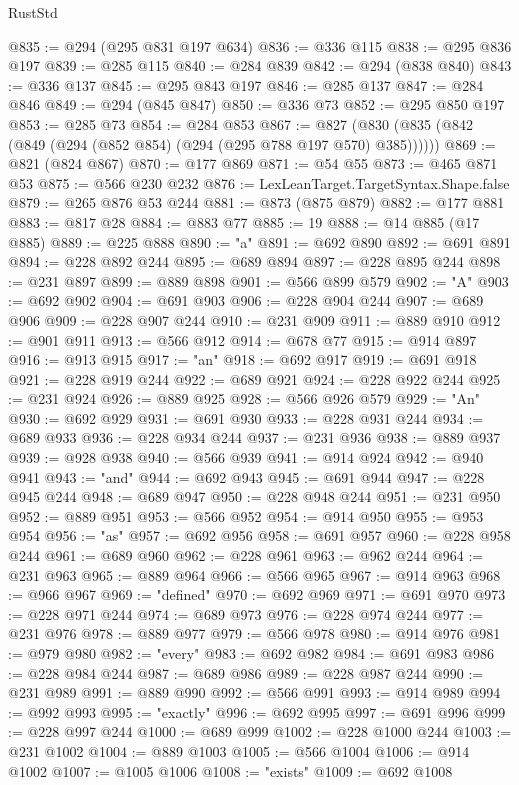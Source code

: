 \begin{lexlean}{RustStd}
\begin{coremodule}
@835 := @294 (@295 @831 @197 @634)
@836 := @336 @115
@838 := @295 @836 @197
@839 := @285 @115
@840 := @284 @839
@842 := @294 (@838 @840)
@843 := @336 @137
@845 := @295 @843 @197
@846 := @285 @137
@847 := @284 @846
@849 := @294 (@845 @847)
@850 := @336 @73
@852 := @295 @850 @197
@853 := @285 @73
@854 := @284 @853
@867 := @827 (@830 (@835 (@842 (@849 (@294 (@852 @854) (@294 (@295 @788 @197 @570) @385))))))
@869 := @821 (@824 @867)
@870 := @177 @869
@871 := @54 @55
@873 := @465 @871 @53
@875 := @566 @230 @232
@876 := LexLeanTarget.TargetSyntax.Shape.false
@879 := @265 @876 @53 @244
@881 := @873 (@875 @879)
@882 := @177 @881
@883 := @817 @28
@884 := @883 @77
@885 := 19
@888 := @14 @885 (@17 @885)
@889 := @225 @888
@890 := "a"
@891 := @692 @890
@892 := @691 @891
@894 := @228 @892 @244
@895 := @689 @894
@897 := @228 @895 @244
@898 := @231 @897
@899 := @889 @898
@901 := @566 @899 @579
@902 := "A"
@903 := @692 @902
@904 := @691 @903
@906 := @228 @904 @244
@907 := @689 @906
@909 := @228 @907 @244
@910 := @231 @909
@911 := @889 @910
@912 := @901 @911
@913 := @566 @912
@914 := @678 @77
@915 := @914 @897
@916 := @913 @915
@917 := "an"
@918 := @692 @917
@919 := @691 @918
@921 := @228 @919 @244
@922 := @689 @921
@924 := @228 @922 @244
@925 := @231 @924
@926 := @889 @925
@928 := @566 @926 @579
@929 := "An"
@930 := @692 @929
@931 := @691 @930
@933 := @228 @931 @244
@934 := @689 @933
@936 := @228 @934 @244
@937 := @231 @936
@938 := @889 @937
@939 := @928 @938
@940 := @566 @939
@941 := @914 @924
@942 := @940 @941
@943 := "and"
@944 := @692 @943
@945 := @691 @944
@947 := @228 @945 @244
@948 := @689 @947
@950 := @228 @948 @244
@951 := @231 @950
@952 := @889 @951
@953 := @566 @952
@954 := @914 @950
@955 := @953 @954
@956 := "as"
@957 := @692 @956
@958 := @691 @957
@960 := @228 @958 @244
@961 := @689 @960
@962 := @228 @961
@963 := @962 @244
@964 := @231 @963
@965 := @889 @964
@966 := @566 @965
@967 := @914 @963
@968 := @966 @967
@969 := "defined"
@970 := @692 @969
@971 := @691 @970
@973 := @228 @971 @244
@974 := @689 @973
@976 := @228 @974 @244
@977 := @231 @976
@978 := @889 @977
@979 := @566 @978
@980 := @914 @976
@981 := @979 @980
@982 := "every"
@983 := @692 @982
@984 := @691 @983
@986 := @228 @984 @244
@987 := @689 @986
@989 := @228 @987 @244
@990 := @231 @989
@991 := @889 @990
@992 := @566 @991
@993 := @914 @989
@994 := @992 @993
@995 := "exactly"
@996 := @692 @995
@997 := @691 @996
@999 := @228 @997 @244
@1000 := @689 @999
@1002 := @228 @1000 @244
@1003 := @231 @1002
@1004 := @889 @1003
@1005 := @566 @1004
@1006 := @914 @1002
@1007 := @1005 @1006
@1008 := "exists"
@1009 := @692 @1008

\end{coremodule}
\end{lexlean}
